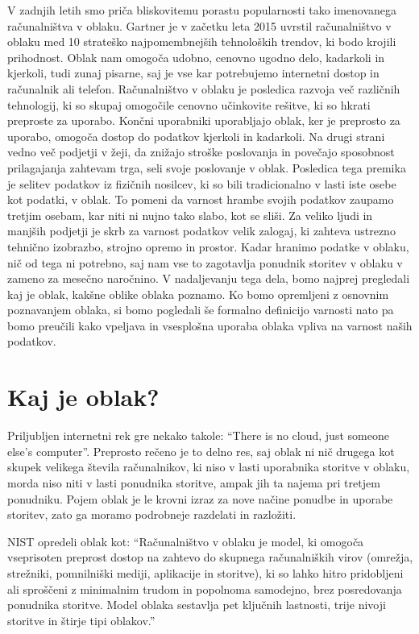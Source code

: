 \documentclass[12pt,a4paper,openany]{book}
\begin{document}
V zadnjih letih smo priča bliskovitemu porastu popularnosti tako imenovanega računalništva v oblaku. Gartner je v začetku leta 2015 uvrstil računalništvo v oblaku med 10 strateško najpomembnejših tehnoloških trendov, ki bodo krojili prihodnost. Oblak nam omogoča udobno, cenovno ugodno delo, kadarkoli in kjerkoli, tudi zunaj pisarne, saj je vse kar potrebujemo internetni dostop in računalnik ali telefon. Računalništvo v oblaku je posledica razvoja več različnih tehnologij, ki so skupaj omogočile cenovno učinkovite rešitve, ki so hkrati preproste za uporabo. Končni uporabniki uporabljajo oblak, ker je preprosto za uporabo, omogoča dostop do podatkov kjerkoli in kadarkoli. Na drugi strani vedno več podjetji v žeji, da znižajo stroške poslovanja in povečajo sposobnost prilagajanja zahtevam trga, seli svoje poslovanje v oblak. Posledica tega premika je selitev podatkov iz fizičnih nosilcev, ki so bili tradicionalno v lasti iste osebe kot podatki, v oblak. To pomeni da varnost hrambe svojih podatkov zaupamo tretjim osebam, kar niti ni nujno tako slabo, kot se sliši. Za veliko ljudi in manjših podjetji je skrb za varnost podatkov velik zalogaj, ki zahteva ustrezno tehnično izobrazbo, strojno opremo in prostor. Kadar hranimo podatke v oblaku, nič od tega ni potrebno, saj nam vse to zagotavlja ponudnik storitev v oblaku v zameno za mesečno naročnino. V nadaljevanju tega dela, bomo najprej pregledali kaj je oblak, kakšne oblike oblaka poznamo. Ko bomo opremljeni z osnovnim poznavanjem oblaka, si bomo pogledali še formalno definicijo varnosti nato pa bomo preučili kako vpeljava in vsesplošna uporaba oblaka vpliva na varnost naših podatkov.

\section{Kaj je oblak?}
Priljubljen internetni rek gre nekako takole: “There is no cloud, just someone else's computer”. Preprosto rečeno je to delno res, saj oblak ni nič drugega kot skupek velikega števila računalnikov, ki niso v lasti uporabnika storitve v oblaku, morda niso niti v lasti ponudnika storitve, ampak jih ta najema pri tretjem ponudniku. Pojem oblak je le krovni izraz za nove načine ponudbe in uporabe storitev, zato ga moramo podrobneje razdelati in razložiti.

NIST opredeli oblak kot: “Računalništvo v oblaku je model, ki omogoča vseprisoten preprost dostop na zahtevo do skupnega računalniških virov (omrežja, strežniki, pomnilniški mediji, aplikacije in storitve), ki so lahko hitro pridobljeni ali sproščeni z minimalnim trudom in popolnoma samodejno, brez posredovanja ponudnika storitve. Model oblaka sestavlja pet ključnih lastnosti, trije nivoji storitve in štirje tipi oblakov.”
\end{document}
